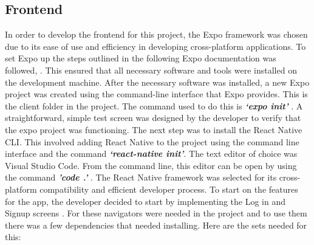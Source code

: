 \subsection{Frontend}
In order to develop the frontend for this project, the Expo framework was chosen due to its ease of use and efficiency in developing cross-platform applications. To set Expo up the steps outlined in the following Expo documentation was followed, \cite{buildRNscreen}. This ensured that all necessary software and tools were installed on the development machine. After the necessary software was installed, a new Expo project was created using the command-line interface that Expo provides. This is the client folder in the project. The command used to do this is \textbf{\emph{‘expo init’}} . A straightforward, simple test screen was designed by the developer to verify that the expo project was functioning.
\newline \newline
The next step was to install the React Native CLI. This involved adding React Native to the project using the command line interface and the command \textbf{\emph{‘react-native init’}}. The text editor of choice was Visual Studio Code. From the command line, this editor can be open by using the command \textbf{\emph{'code .'}} .
\newline \newline
The React Native framework was selected for its cross-platform compatibility and efficient developer process. To start on the features for the app, the developer decided to start by implementing the  Log in and Signup screens \cite{login&reg}. For these navigators were needed in the project and to use them there was a few dependencies that needed installing. Here are the sets needed for this:
\newline \newline
